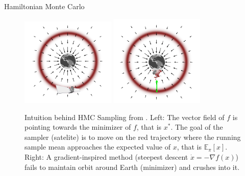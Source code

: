 \documentclass[10pt]{beamer}
\begin{document}
\begin{frame}[allowframebreaks]{Hamiltonian Monte Carlo}
    \framebreak
    
    \begin{figure}
        \centering
        \includegraphics[width=0.4\textwidth]{publications/presentations/log_concave_sampling/satelite.png} \quad
         \includegraphics[width=0.4\textwidth]{publications/presentations/log_concave_sampling/crushing.png}
        \caption{Intuition behind HMC Sampling from \cite{betancourt2017conceptual}. Left: The vector field of $f$ is pointing towards the minimizer of $f$, that is $x^*$. The goal of the sampler (satelite) is to move on the red trajectory where the running sample mean approaches the expected value of $x$, that is $\mathbb E_{\pi} [x]$. Right: A gradient-inspired method (steepest descent $\dot x = - \nabla f(x)$) fails to maintain orbit around Earth (minimizer) and crushes into it.}
        \label{fig:my_label}
    \end{figure}
    
    \framebreak
    

\end{frame}
\end{document}
